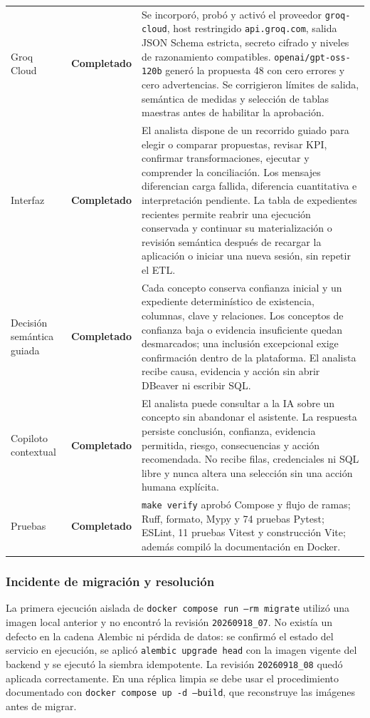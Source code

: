 \documentclass[11pt,letterpaper]{article}
\newcommand{\statusok}{\textcolor{deepgreen}{\textbf{Completado}}}
\newcommand{\file}[1]{\texttt{#1}}
\begin{document}
\begin{longtable}{@{}p{}p{}p{}@{}}
  Groq Cloud & \statusok & Se incorporó, probó y activó el proveedor \file{groq-cloud}, host restringido \file{api.groq.com}, salida JSON Schema estricta, secreto cifrado y niveles de razonamiento compatibles. \file{openai/gpt-oss-120b} generó la propuesta 48 con cero errores y cero advertencias. Se corrigieron límites de salida, semántica de medidas y selección de tablas maestras antes de habilitar la aprobación. \\
  Interfaz & \statusok & El analista dispone de un recorrido guiado para elegir o comparar propuestas, revisar KPI, confirmar transformaciones, ejecutar y comprender la conciliación. Los mensajes diferencian carga fallida, diferencia cuantitativa e interpretación pendiente. La tabla de expedientes recientes permite reabrir una ejecución conservada y continuar su materialización o revisión semántica después de recargar la aplicación o iniciar una nueva sesión, sin repetir el ETL. \\
  Decisión semántica guiada & \statusok & Cada concepto conserva confianza inicial y un expediente determinístico de existencia, columnas, clave y relaciones. Los conceptos de confianza baja o evidencia insuficiente quedan desmarcados; una inclusión excepcional exige confirmación dentro de la plataforma. El analista recibe causa, evidencia y acción sin abrir DBeaver ni escribir SQL. \\
  Copiloto contextual & \statusok & El analista puede consultar a la IA sobre un concepto sin abandonar el asistente. La respuesta persiste conclusión, confianza, evidencia permitida, riesgo, consecuencias y acción recomendada. No recibe filas, credenciales ni SQL libre y nunca altera una selección sin una acción humana explícita. \\
  Pruebas & \statusok & \file{make verify} aprobó Compose y flujo de ramas; Ruff, formato, Mypy y 74 pruebas Pytest; ESLint, 11 pruebas Vitest y construcción Vite; además compiló la documentación en Docker. \\
  \bottomrule
\end{longtable}

\subsubsection{Incidente de migración y resolución}

La primera ejecución aislada de \file{docker compose run --rm migrate} utilizó una imagen local anterior y no encontró la revisión \file{20260918\_07}. No existía un defecto en la cadena Alembic ni pérdida de datos: se confirmó el estado del servicio en ejecución, se aplicó \file{alembic upgrade head} con la imagen vigente del backend y se ejecutó la siembra idempotente. La revisión \file{20260918\_08} quedó aplicada correctamente. En una réplica limpia se debe usar el procedimiento documentado con \file{docker compose up -d --build}, que reconstruye las imágenes antes de migrar.
\end{document}
